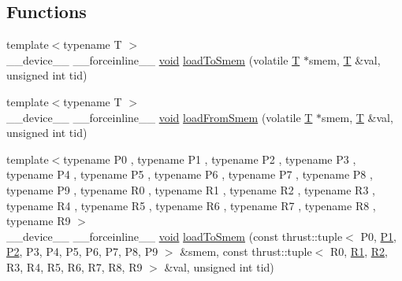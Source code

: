 \subsection*{Functions}
\begin{DoxyCompactItemize}
\item 
{\footnotesize template$<$typename T $>$ }\\\-\_\-\-\_\-device\-\_\-\-\_\- \-\_\-\-\_\-forceinline\-\_\-\-\_\- \hyperlink{legacy_8hpp_a8bb47f092d473522721002c86c13b94e}{void} \hyperlink{namespacecv_1_1gpu_1_1device_1_1reduce__detail_a53d8fc2c40797c06caca8f9ea93d33d2}{load\-To\-Smem} (volatile \hyperlink{calib3d_8hpp_a3efb9551a871ddd0463079a808916717}{T} $\ast$smem, \hyperlink{calib3d_8hpp_a3efb9551a871ddd0463079a808916717}{T} \&val, unsigned int tid)
\item 
{\footnotesize template$<$typename T $>$ }\\\-\_\-\-\_\-device\-\_\-\-\_\- \-\_\-\-\_\-forceinline\-\_\-\-\_\- \hyperlink{legacy_8hpp_a8bb47f092d473522721002c86c13b94e}{void} \hyperlink{namespacecv_1_1gpu_1_1device_1_1reduce__detail_a261236c3c0cccd9f4c73c8683f25e731}{load\-From\-Smem} (volatile \hyperlink{calib3d_8hpp_a3efb9551a871ddd0463079a808916717}{T} $\ast$smem, \hyperlink{calib3d_8hpp_a3efb9551a871ddd0463079a808916717}{T} \&val, unsigned int tid)
\item 
{\footnotesize template$<$typename P0 , typename P1 , typename P2 , typename P3 , typename P4 , typename P5 , typename P6 , typename P7 , typename P8 , typename P9 , typename R0 , typename R1 , typename R2 , typename R3 , typename R4 , typename R5 , typename R6 , typename R7 , typename R8 , typename R9 $>$ }\\\-\_\-\-\_\-device\-\_\-\-\_\- \-\_\-\-\_\-forceinline\-\_\-\-\_\- \hyperlink{legacy_8hpp_a8bb47f092d473522721002c86c13b94e}{void} \hyperlink{namespacecv_1_1gpu_1_1device_1_1reduce__detail_a442c9f9e45bb0f1e400baaa9dbf897b6}{load\-To\-Smem} (const thrust\-::tuple$<$ P0, \hyperlink{calib3d_8hpp_a81046431a4ff9a0e8b93536f19efac38}{P1}, \hyperlink{calib3d_8hpp_a704ac1a3954b1c810117417a050e7f76}{P2}, P3, P4, P5, P6, P7, P8, P9 $>$ \&smem, const thrust\-::tuple$<$ R0, \hyperlink{calib3d_8hpp_ab4d5cbb79188a091449ea6430cd5ec59}{R1}, \hyperlink{calib3d_8hpp_a08847b11703596b1db049ef98d450eaa}{R2}, R3, R4, R5, R6, R7, R8, R9 $>$ \&val, unsigned int tid)
\item 

\end{DoxyCompactItemize}
